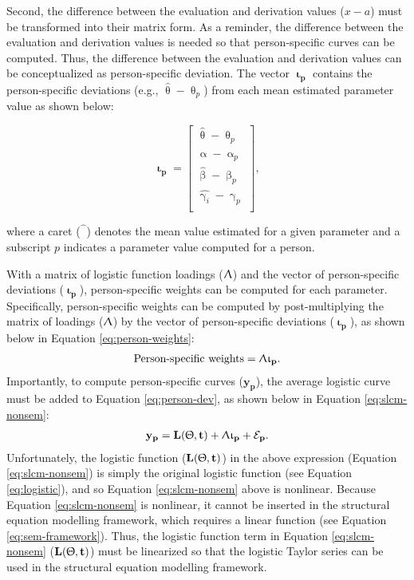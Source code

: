 \documentclass[
12pt, %
twoside,
english]{guelphthesis}
\begin{document}
Second, the difference between the evaluation and derivation values (\(x - a\)) must be transformed into their matrix form. As a reminder, the difference between the evaluation and derivation values is needed so that person-specific curves can be computed. Thus, the difference between the evaluation and derivation values can be conceptualized as person-specific deviation. The vector \(\mathbf{\upiota_p}\) contains the person-specific deviations (e.g., \(\hat{\uptheta} - \uptheta_p\)) from each mean estimated parameter value as shown below:

\[ 
\mathbf{\upiota_p} = 
\begin{bmatrix}
\hat{\uptheta} - \uptheta_p   \\ 
\hat{\upalpha} - \upalpha_p   \\ 
\hat{\upbeta} - \upbeta_p \\ 
\hat{\upgamma_i} - \upgamma_p \\
\end{bmatrix},
\]

\noindent where a caret (\(\hat{\phantom{\beta}}\)) denotes the mean value estimated
for a given parameter and a subscript \(p\) indicates a parameter value
computed for a person.

With a matrix of logistic function loadings (\(\mathbf{\Uplambda}\)) and the vector of person-specific deviations (\(\mathbf{\upiota_p}\)), person-specific weights can be computed for each parameter. Specifically, person-specific weights can be computed by post-multiplying the matrix of loadings (\(\mathbf{\Uplambda}\)) by the vector of person-specific deviations (\(\mathbf{\upiota_p}\)), as shown below in Equation \ref{eq:person-weights}:
\begin{align}
 \text{Person-specific weights} = \mathbf{\Uplambda\upiota_p}.
 \label{eq:person-weights}
\end{align}
\noindent Importantly, to compute person-specific curves (\(\mathbf{y_p}\)), the average logistic curve must be added to Equation \ref{eq:person-dev}, as shown below in Equation \ref{eq:slcm-nonsem}:
\begin{align}
 \mathbf{y_p} = \mathbf{L(\Uptheta, t)} + \mathbf{\Uplambda\upiota_p} + \mathbf{\mathcal{E}_p}.
 \label{eq:slcm-nonsem}
\end{align}
\noindent Unfortunately, the logistic function (\(\mathbf{L(\Uptheta, t)}\)) in the above expression (Equation \ref{eq:slcm-nonsem}) is simply the original logistic function (see Equation \ref{eq:logistic}), and so Equation \ref{eq:slcm-nonsem} above is nonlinear. Because Equation \ref{eq:slcm-nonsem} is nonlinear, it cannot be inserted in the structural equation modelling framework, which requires a linear function (see Equation \ref{eq:sem-framework}). Thus, the logistic function term in Equation \ref{eq:slcm-nonsem} (\(\mathbf{L(\Uptheta, t)}\)) must be linearized so that the logistic Taylor series can be used in the structural equation modelling framework.
\end{document}
